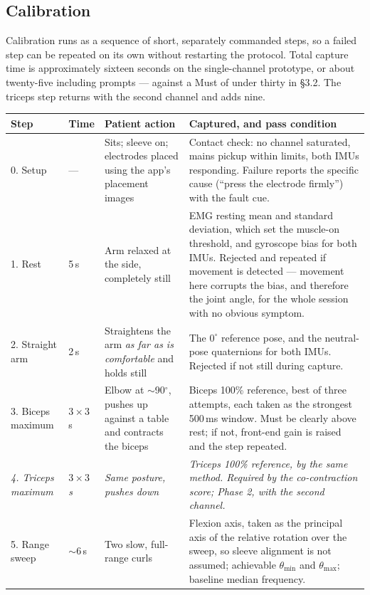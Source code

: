 \documentclass[11pt]{article}
\begin{document}
\subsection{Calibration}

Calibration runs as a sequence of short, separately commanded steps, so a failed
step can be repeated on its own without restarting the protocol. Total capture
time is approximately sixteen seconds on the single-channel prototype, or about
twenty-five including prompts --- against a Must of under thirty in \S3.2. The
triceps step returns with the second channel and adds nine.

\begin{table}[H]
\centering\small
\begin{tabularx}{\linewidth}{@{}p{24mm} p{11mm} p{40mm} X@{}}
\toprule
\textbf{Step} & \textbf{Time} & \textbf{Patient action} & \textbf{Captured, and pass condition} \\
\midrule
0. Setup & --- &
Sits; sleeve on; electrodes placed using the app's placement images &
Contact check: no channel saturated, mains pickup within limits, both IMUs
responding. Failure reports the specific cause (``press the electrode firmly'')
with the fault cue. \\[3pt]
1. Rest & 5\,s &
Arm relaxed at the side, completely still &
EMG resting mean and standard deviation, which set the muscle-on threshold, and
gyroscope bias for both IMUs. Rejected and repeated if movement is detected ---
movement here corrupts the bias, and therefore the joint angle, for the whole
session with no obvious symptom. \\[3pt]
2. Straight arm & 2\,s &
Straightens the arm \emph{as far as is comfortable} and holds still &
The $0^{\circ}$ reference pose, and the neutral-pose quaternions for both IMUs.
Rejected if not still during capture. \\[3pt]
3. Biceps maximum & $3\times3$\,s &
Elbow at $\sim$90$^{\circ}$, pushes up against a table and contracts the biceps &
Biceps 100\% reference, best of three attempts, each taken as the strongest
500\,ms window. Must be clearly above rest; if not, front-end gain is raised and
the step repeated. \\[3pt]
\textit{4. Triceps maximum} & \textit{$3\times3$\,s} &
\textit{Same posture, pushes down} &
\textit{Triceps 100\% reference, by the same method. Required by the
co-contraction score; Phase 2, with the second channel.} \\[3pt]
5. Range sweep & $\sim$6\,s &
Two slow, full-range curls &
Flexion axis, taken as the principal axis of the relative rotation over the
sweep, so sleeve alignment is not assumed; achievable $\theta_{\min}$ and
$\theta_{\max}$; baseline median frequency. \\
\bottomrule
\end{tabularx}
\end{table}
\end{document}
